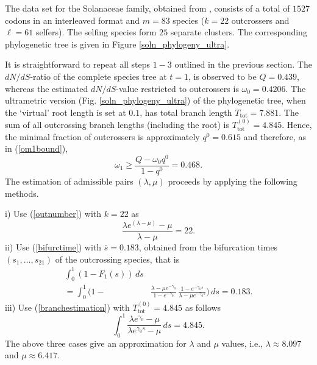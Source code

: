 \documentclass[a4paper,11pt]{article}
\theoremstyle{plain}
\theoremstyle{definition}
\numberwithin{equation}{section}
\begin{document}
The data set for the Solanaceae family, obtained from \cite{glemin_muyle}, consists 
of a total of $1527$ codons in an interleaved format and  
$m=83$ species ($k=22$ outcrossers and $\ell=61$ 
selfers). The selfing species form $25$ separate clusters. The 
corresponding phylogenetic tree is given in 
Figure \ref{soln_phylogeny_ultra}. 

It is straightforward to repeat all steps $1-3$ outlined in the
previous section.  The $dN/dS$-ratio of the complete
species tree at $t=1$, is observed to be $Q=0.439$, whereas the
estimated $dN/dS$-value restricted to outcrossers is
$\omega_0=0.4206$. The ultrametric version 
(Fig. \ref{soln_phylogeny_ultra}) of the phylogenetic tree, when the
`virtual' root length is set at $0.1$, has total branch length 
$T_\mathrm{tot}=7.881$. The sum of all outcrossing branch 
lengths (including the root) is
$T^{(0)}_\mathrm{tot}=4.845$. 
Hence, the minimal fraction of outcrossers 
is approximately $q^0= 0.615$ 
and therefore, as in (\ref{om1bound}),
\[
\omega_1\ge \frac{Q- \omega_0 q^0}{1-q^0}=0.468.
\]
The estimation of admissible pairs $(\lambda,\mu)$ proceeds by
applying the following methods.

\noindent
i) Use (\ref{outnumber}) with $k=22$ as
\begin{equation}\nonumber
\frac{\lambda e^{(\lambda-\mu)}-\mu}{\lambda-\mu}=22.
\end{equation}
ii) Use (\ref{bifurctime}) with $\bar{s}=0.183$, 
obtained from the bifurcation times $(s_1,\dots,s_{21})$ 
of the outcrossing species, that is
\begin{align*}
\int_0^1(1-F_1(s))\,ds \\=\int_0^1 \big(1-&\frac{\lambda-\mu
  e^{-\gamma_0}}{1-e^{-\gamma_0}}\,\frac{1-e^{-\gamma_0
    s}}{\lambda-\mu e^{-\gamma_0 s}}\Big)\,ds \nonumber = 0.183. 
\end{align*}
\noindent
iii) Use (\ref{branchestimation}) with $T^{(0)}_\mathrm{tot}=4.845$ as follows
\begin{equation}\nonumber
\int_0^1 \frac{\lambda e^{\gamma_0}-\mu}{\lambda
  e^{\gamma_0s}-\mu}\,ds=4.845. 
\end{equation}
The above three cases give an approximation for $\lambda$ 
and $\mu$ values, i.e.,  $\lambda\approx 8.097$ 
and $\mu\approx 6.417$.
\end{document}
